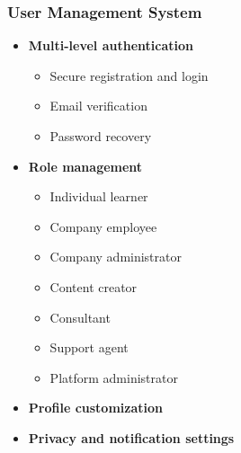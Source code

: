 \documentclass{beamer}
\begin{document}
\begin{frame}
\frametitle{User Management System}
\begin{itemize}
    \item \textbf{Multi-level authentication}
    \begin{itemize}
        \item Secure registration and login
        \item Email verification
        \item Password recovery
    \end{itemize}
    \item \textbf{Role management}
    \begin{itemize}
        \item Individual learner
        \item Company employee
        \item Company administrator
        \item Content creator
        \item Consultant
        \item Support agent
        \item Platform administrator
    \end{itemize}
    \item \textbf{Profile customization}
    \item \textbf{Privacy and notification settings}
\end{itemize}
\end{frame}
\end{document}
